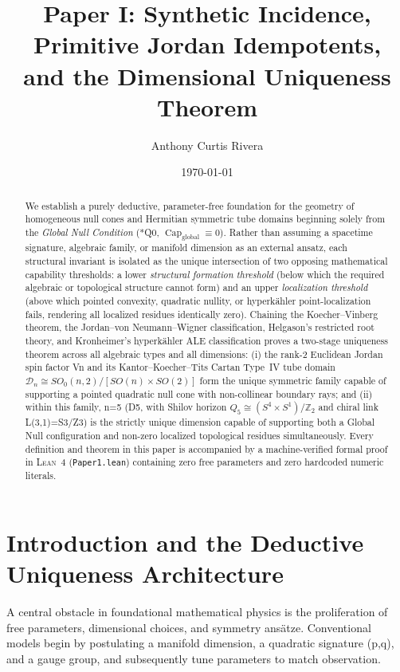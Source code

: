 \documentclass[11pt,reqno]{amsart}
\title[Synthetic Incidence and the Dimensional Uniqueness Theorem]{%
  Paper I: Synthetic Incidence, Primitive Jordan Idempotents,\\
  and the Dimensional Uniqueness Theorem%
}
\author{Anthony Curtis Rivera}
\date{\today}
\theoremstyle{definition}
\theoremstyle{remark}
\newcommand{\CapGlobal}{\operatorname{Cap}_{\mathrm{global}}}
\begin{document}
\begin{abstract}
We establish a purely deductive, parameter-free foundation for the geometry of homogeneous null cones and Hermitian symmetric tube domains beginning solely from the \emph{Global Null Condition} (*Q0, $\CapGlobal \equiv 0$). Rather than assuming a spacetime signature, algebraic family, or manifold dimension as an external ansatz, each structural invariant is isolated as the unique intersection of two opposing mathematical capability thresholds: a lower \emph{structural formation threshold} (below which the required algebraic or topological structure cannot form) and an upper \emph{localization threshold} (above which pointed convexity, quadratic nullity, or hyperk\"ahler point-localization fails, rendering all localized residues identically zero). Chaining the Koecher--Vinberg theorem, the Jordan--von Neumann--Wigner classification, Helgason's restricted root theory, and Kronheimer's hyperk\"ahler ALE classification proves a two-stage uniqueness theorem across all algebraic types and all dimensions: (i) the rank-2 Euclidean Jordan spin factor Vn and its Kantor--Koecher--Tits Cartan Type~IV tube domain $\mathcal{D}_n \cong SO_0(n,2)/[SO(n)\times SO(2)]$ form the unique symmetric family capable of supporting a pointed quadratic null cone with non-collinear boundary rays; and (ii) within this family, n=5 (D5, with Shilov horizon $Q_5 \cong (S^4 \times S^1)/\mathbb{Z}_2$ and chiral link L(3,1)=S3/Z3) is the strictly unique dimension capable of supporting both a Global Null configuration and non-zero localized topological residues simultaneously. Every definition and theorem in this paper is accompanied by a machine-verified formal proof in \textsc{Lean~4} (\texttt{Paper1.lean}) containing zero free parameters and zero hardcoded numeric literals.
\end{abstract}

\maketitle
\tableofcontents

\section{Introduction and the Deductive Uniqueness Architecture}

A central obstacle in foundational mathematical physics is the proliferation of free parameters, dimensional choices, and symmetry ans\"atze. Conventional models begin by postulating a manifold dimension, a quadratic signature (p,q), and a gauge group, and subsequently tune parameters to match observation.
\end{document}
